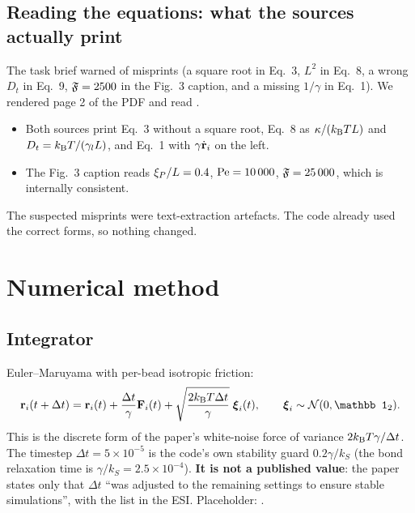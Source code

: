 \documentclass[11pt]{article}
\begin{document}
\subsection{Reading the equations: what the sources actually print}\label{sec:printed}
The task brief warned of misprints (a square root in Eq.~3, $L^2$ in Eq.~8, a wrong $D_t$ in Eq.~9, $\mathfrak{F}=2500$ in the Fig.~3 caption, and a missing $1/\gamma$ in Eq.~1).
We rendered page 2 of the PDF and read .
\begin{itemize}
\item Both sources print Eq.~3 without a square root, Eq.~8 as $\kappa/(k_{\mathrm{B}}T L)$ and $D_t=k_{\mathrm{B}}T/(\gamma_{l} L)$, and Eq.~1 with $\gamma\dot{\mathbf{r}}_i$ on the left.
\item The Fig.~3 caption reads $\xi_{P}/L=0.4$, $\mathrm{Pe}=10\,000$, $\mathfrak{F}=25\,000$, which is internally consistent.
\end{itemize}
The suspected misprints were text-extraction artefacts. The code already used the correct forms, so nothing changed.

\section{Numerical method}\label{sec:numerics}
\subsection{Integrator}
Euler--Maruyama with per-bead isotropic friction:
\begin{equation}
\vect r_i(t+\Delta t)=\vect r_i(t)+\frac{\Delta t}{\gamma}\vect F_i(t)+\sqrt{\frac{2\kT\Delta t}{\gamma}}\;\boldsymbol\xi_i(t),\qquad \boldsymbol\xi_i\sim\mathcal N(0,\mathbb 1_2).
\end{equation}
This is the discrete form of the paper's white-noise force of variance $2k_{\mathrm{B}}T\gamma/\Delta t$.
The timestep $\Delta t=5\times10^{-5}$ is the code's own stability guard $0.2\gamma/k_S$ (the bond relaxation time is
$\gamma/k_S=2.5\times10^{-4}$). \textbf{It is not a published value}: the paper states only that $\Delta t$ ``was adjusted to the
remaining settings to ensure stable simulations'', with the list in the ESI. Placeholder: .
\end{document}
